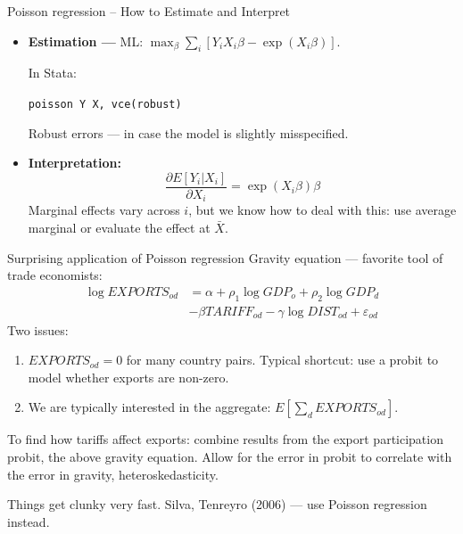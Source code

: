 \documentclass[pdftex]{beamer}
\begin{document}
\begin{frame}{Poisson regression -- How to Estimate and Interpret}
	\begin{itemize}
		\item\textbf{Estimation ---} ML: $\max_\beta\sum_i\left[Y_iX_i\beta - \exp(X_i\beta)\right]$.
		
		In Stata:
		\begin{center}
			\texttt{poisson Y X, vce(robust)}
		\end{center}
		Robust errors --- in case the model is slightly misspecified.
		\item\textbf{Interpretation:}
		\begin{equation*}
			\frac{\partial{}E[Y_i|X_i]}{\partial{}X_i} = \exp(X_i\beta)\beta
		\end{equation*}
		Marginal effects vary across $i$, but we know how to deal with this: use average marginal or evaluate the effect at $\bar{X}$.
	\end{itemize}
\end{frame}

\begin{frame}{Surprising application of Poisson regression}
	Gravity equation --- favorite tool of trade economists:
	\begin{align*}
		\log{EXPORTS_{od}} &= \alpha + \rho_1\log{GDP_o} + \rho_2\log{GDP_d}\\
			&-\beta{}TARIFF_{od} - \gamma\log{DIST_{od}} + \varepsilon_{od}
	\end{align*}
	Two issues:
	\begin{enumerate}
		\item $EXPORTS_{od} = 0$ for many country pairs. Typical shortcut: use a probit to model whether exports are non-zero.
		\item We are typically interested in the aggregate: $E[\sum_d{}EXPORTS_{od}]$.
	\end{enumerate}
	To find how tariffs affect exports: combine results from the export participation probit, the above gravity equation. Allow for the error in probit to correlate with the error in gravity, heteroskedasticity.\\\medskip
	
	Things get clunky very fast. Silva, Tenreyro (2006) --- use Poisson regression instead.
\end{frame}
\end{document}
